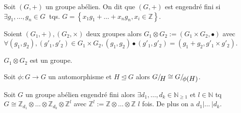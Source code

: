          \begin{definition}
    \label{def:49}
    Soit $(G,+)$ un groupe abélien. On dit que $(G,+)$ est engendré fini si $\exists g_1,\dots,g_n \in G\ $ tqs. $G= \left\{ x_1g_1+\dots+x_ng_n, x_i \in \mathbb{Z} \right\} $.
        \end{definition}
        
        
          \begin{definition}
    \label{def:49}
    Soient $(G_1,+), (G_2,\times)$ deux groupes alors $G_1\otimes G_2 :=(G_1\times G_2, \bullet )$ avec $\forall (g_1,g_2), (g'_1,g'_2) \in G_1\times G_2, (g_1,g_2)\bullet (g'_1,g'_2)= (g_1+g_2, g'_1 \times g'_2)$.
    \end{definition}
    
        \begin{remark}
        \label{rem:2}
         $G_1\otimes G_2$ est un groupe.
        \end{remark}
        
        
         \begin{lemma}
    \label{lem:23}
    Soit $\phi:G\rightarrow G$ un automorphisme et $H\unlhd G$ alors $ G/\!\raisebox{-.65ex}{\ensuremath{{H}}} \cong G/\!\raisebox{-.65ex}{\ensuremath{{ \phi (H)}}}$.
    \end{lemma}
        
          \begin{theorem}
    \label{thr:28}
    Soit $G$ un groupe abélien engendré fini alors $\exists d_1,\dots,d_k \in \mathbb{N}_{ \ge 1}$ et $l\in \mathbb{N}$ tq $G  \cong \mathbb{Z}_{d_1} \otimes \dots \otimes \mathbb{Z}_{d_k} \otimes \mathbb{Z}^l$ avec $\mathbb{Z}^l:=\mathbb{Z} \otimes \dots 
   \otimes \mathbb{Z}$ $l$ fois. De plus on a $d_1|\dots\ |d_k$.
    \end{theorem}
    

